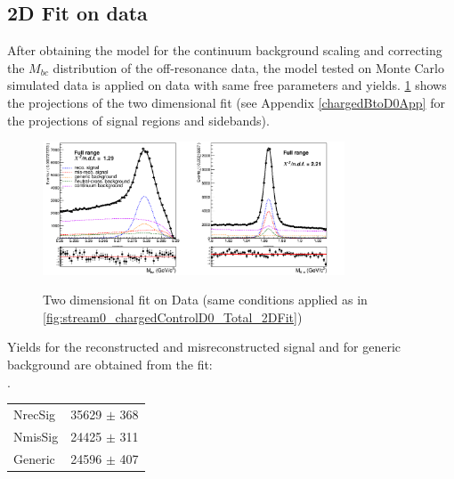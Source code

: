 \subsection{2D Fit on data}\label{chargedBtoD0_2Dfit_onData}
 After obtaining the model for the continuum background scaling and correcting the $M_{bc}$ distribution of the off-resonance data, the model tested on Monte Carlo simulated data is applied on data with same free parameters and yields. \cref{fig:chargedControlD0_Total_2DFit_onData_free_sigmaCB1_InvMsigma} shows the projections of the two dimensional fit (see Appendix \ref{chargedBtoD0App} for the projections of signal regions and sidebands).
\begin{figure}[h!]
{\includegraphics[width=0.80\textwidth]{05-chargedControlSample/figs/chargedControlD0_Total_2DFit_onData_free_sigmaCB1_InvMsigma.png}}
\caption{Two dimensional fit on Data (same conditions applied as in \cref{fig:stream0_chargedControlD0_Total_2DFit})}
\label{fig:chargedControlD0_Total_2DFit_onData_free_sigmaCB1_InvMsigma}
\end{figure}

\noindent Yields for the reconstructed and misreconstructed signal and for generic background are obtained from the fit: \\
 .
 \newline  \hspace{3.5 cm}
\begin{tabular}{ |p{3cm}||p{3cm}|  }

 \hline
 NrecSig  &  35629 $\pm$ 368\\
 NmisSig &  24425 $\pm$ 311 \\
 Generic & 24596 $\pm$ 407\\
 \hline
\end{tabular}
\newline
\vspace{1.5 cm}

